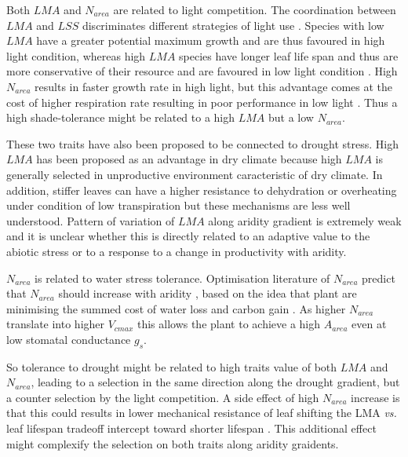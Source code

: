 \documentclass[a4paper,11pt]{article}
\begin{document}
Both $LMA$ and $N_{area}$ are related to light competition. The coordination between $LMA$ and $LSS$ discriminates different
strategies of light use \citep{Falster-2018}. Species with low $LMA$
have a greater potential maximum growth and are thus favoured in high
light condition, whereas high $LMA$ species have longer leaf life span
and thus are more conservative of their resource and are favoured in
low light condition \citep{Falster-2018}. High $N_{area}$ results in faster growth rate in
high light, but this advantage comes at the cost of higher respiration
rate resulting in poor performance in low light
\citep{Falster-2018}. Thus a high shade-tolerance might be related to
a high $LMA$ but a low $N_{area}$.


These two traits have also been proposed to be connected to drought
stress. High $LMA$ has been proposed as an advantage in dry climate
because high $LMA$ is generally selected in unproductive environment
caracteristic of dry climate. In addition, stiffer leaves can have a higher resistance to dehydration
\citep{Wright-2002a,Wright-2002b} or overheating
under condition of low transpiration \citep{Leigh-2012} but these
mechanisms are less well understood.
Pattern of variation of $LMA$ along aridity gradient is extremely weak and it is unclear whether this is directly related to an adaptive value to the abiotic stress or to a response to a change in productivity with aridity.
 
$N_{area}$ is related to water stress tolerance. Optimisation literature of $N_{area}$ predict that $N_{area}$ should
increase with aridity \citep{Wright-2003}, based on the idea that plant are minimising the summed cost of water
loss and carbon gain
\citep{Medlyn-2002,Wright-2003,Prentice-2014,Lu-2016,Wang-2017,Dong-2017}. As
higher $N_{area}$ translate into higher $V_{cmax}$ this allows the
plant to achieve a high $A_{area}$ even at low stomatal conductance
$g_s$.

So tolerance to drought might be related to high traits value of both
$LMA$ and $N_{area}$, leading to a selection in the same direction
along the drought gradient, but a counter selection by the light
competition. A side effect of high $N_{area}$
increase is that this could results in lower mechanical
resistance of leaf shifting the LMA \textit{vs.} leaf
lifespan tradeoff intercept toward shorter lifespan
\citep{Wright-2002a}. This additional effect might complexify the
selection on both traits along aridity graidents.
\end{document}
